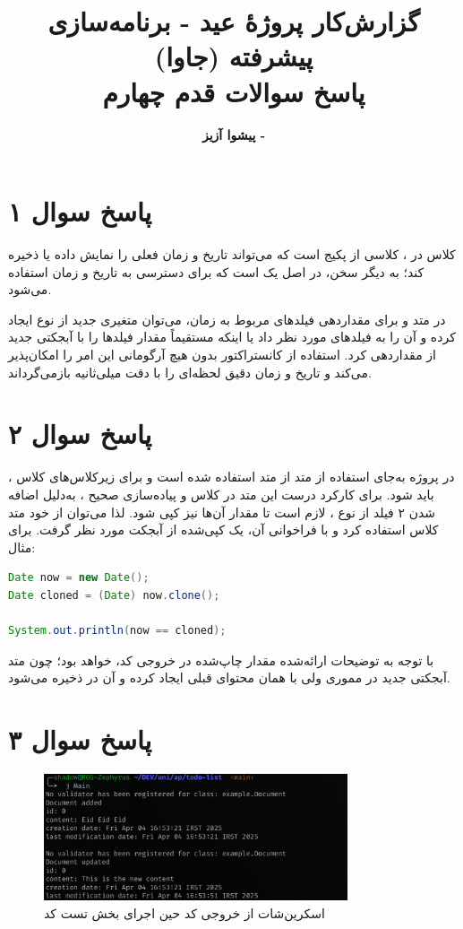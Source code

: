 \documentclass{article}
\title{\textbf{گزارش‌کار پروژۀ عید - برنامه‌سازی پیشرفته (جاوا)}\vspace{1cm}\\پاسخ سوالات قدم چهارم}
\author{\textbf{پیشوا آزیز - \lr{40313003}}}
\date{}
\begin{document}
\maketitle

\vspace{2cm}

\section*{پاسخ سوال ۱}
کلاس  در ، کلاسی از پکیج  است که می‌تواند تاریخ و زمان فعلی را نمایش داده یا ذخیره کند؛ به دیگر سخن، در اصل یک  است که برای دسترسی به تاریخ و زمان استفاده می‌شود.

در متد  و  برای مقداردهی فیلدهای مربوط به زمان، می‌توان متغیری جدید از نوع  ایجاد کرده و آن را به فیلدهای مورد نظر داد یا اینکه مستقیماً مقدار فیلدها را با آبجکتی جدید از  مقداردهی کرد. استفاده از کانستراکتور  بدون هیچ آرگومانی این امر را امکان‌پذیر می‌کند و تاریخ و زمان دقیق لحظه‌ای را با دقت میلی‌ثانیه بازمی‌گرداند.

\section*{پاسخ سوال ۲}
در پروژه به‌جای استفاده از متد  از متد  استفاده شده است و برای زیرکلاس‌های کلاس ، باید  شود. برای کارکرد درست این متد در کلاس  و پیاده‌سازی صحیح ، به‌دلیل اضافه شدن ۲ فیلد از نوع ، لازم است تا مقدار آن‌ها نیز کپی شود. لذا می‌توان از خود متد  کلاس  استفاده کرد و با فراخوانی آن، یک  کپی‌شده از آبجکت مورد نظر گرفت. برای مثال:

\begin{latin}
\begin{lstlisting}[language=Java]
Date now = new Date();
Date cloned = (Date) now.clone();

System.out.println(now == cloned);
\end{lstlisting}
\end{latin}

با توجه به توضیحات ارائه‌شده مقدار چاپ‌شده در خروجی کد،  خواهد بود؛ چون متد  آبجکتی جدید در مموری ولی با همان محتوای قبلی ایجاد کرده و  آن در  ذخیره می‌شود.

\vspace{2cm}

\section*{پاسخ سوال ۳}

\begin{figure}[h]
    \centering
    \includegraphics[width=0.8\textwidth]{../img/screenshot3.png}
    \caption*{اسکرین‌شات از خروجی کد حین اجرای بخش تست کد}
\end{figure}
\end{document}

